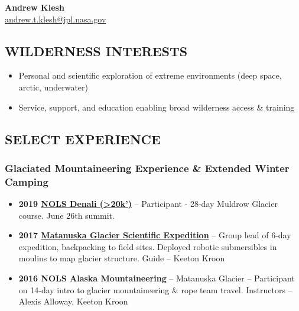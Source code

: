 \documentclass[11pt,letterpaper]{article}
\begin{document}
\begin{center}
    {\Huge\bfseries Andrew Klesh} \\[0.3em]
    {\large \href{mailto:andrew.t.klesh@jpl.nasa.gov}{andrew.t.klesh@jpl.nasa.gov}}
\end{center}

\vspace{0.5em}

\subsection*{WILDERNESS INTERESTS}
\begin{itemize}
\item Personal and scientific exploration of extreme environments (deep space, arctic, underwater)
\item Service, support, and education enabling broad wilderness access \& training
\end{itemize}

\subsection*{SELECT EXPERIENCE}
\subsubsection*{Glaciated Mountaineering Experience \& Extended Winter Camping}
\begin{itemize}
\item \textbf{2019 \href{https://www.nps.gov/dena/blogs/field-report-june-20-2019.htm}{NOLS Denali (>20k’)}} – Participant - 28-day Muldrow Glacier course. June 26th summit.
\item \textbf{2017 \href{https://www.jpl.nasa.gov/news/robot-spelunkers-go-for-a-dip/}{Matanuska Glacier Scientific Expedition}} – Group lead of 6-day expedition, backpacking to field sites. Deployed robotic submersibles in moulins to map glacier structure. Guide – Keeton Kroon
\item \textbf{2016 NOLS Alaska Mountaineering} – Matanuska Glacier – Participant on 14-day intro to glacier mountaineering \& rope team travel. Instructors – Alexis Alloway, Keeton Kroon
\end{itemize}
\end{document}
